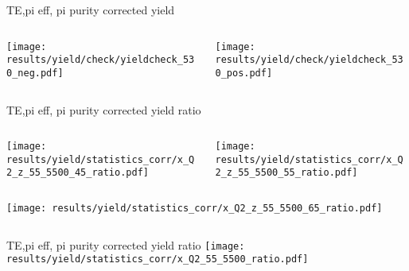 \begin{frame}{TE,pi eff, pi purity corrected yield}
\begin{columns}
\begin{column}[T]{0.5\textwidth}
\texttt{[image: results/yield/check/yieldcheck\_530\_neg.pdf]}
\end{column}
\begin{column}[T]{0.5\textwidth}
\texttt{[image: results/yield/check/yieldcheck\_530\_pos.pdf]}
\end{column}
\end{columns}
\end{frame}
\begin{frame}{TE,pi eff, pi purity corrected yield ratio}
\begin{columns}
\begin{column}[T]{0.5\textwidth}
\texttt{[image: results/yield/statistics\_corr/x\_Q2\_z\_55\_5500\_45\_ratio.pdf]}
\end{column}
\begin{column}[T]{0.5\textwidth}
\texttt{[image: results/yield/statistics\_corr/x\_Q2\_z\_55\_5500\_55\_ratio.pdf]}
\end{column}
\end{columns}
\begin{columns}
\begin{column}[T]{0.5\textwidth}
\texttt{[image: results/yield/statistics\_corr/x\_Q2\_z\_55\_5500\_65\_ratio.pdf]}
\end{column}
\begin{column}[T]{0.5\textwidth}
\end{column}
\end{columns}
\end{frame}
\begin{frame}{TE,pi eff, pi purity corrected yield ratio}
\texttt{[image: results/yield/statistics\_corr/x\_Q2\_55\_5500\_ratio.pdf]}
\end{frame}
